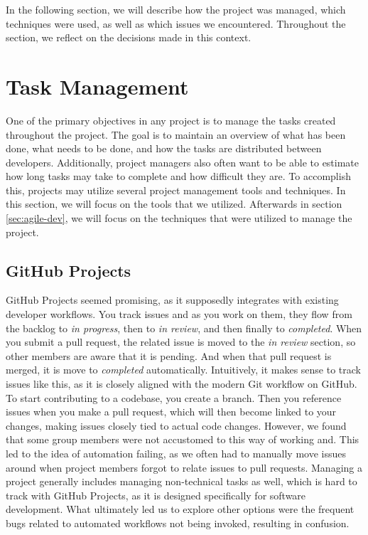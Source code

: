 In the following section, we will describe how the project was managed, which techniques were used, as well as which issues we encountered.
Throughout the section, we reflect on the decisions made in this context.

\section{Task Management}
One of the primary objectives in any project is to manage the tasks created throughout the project. The goal is to maintain an overview of what has been done, what needs to be done, and how the tasks are distributed between developers. Additionally, project managers also often want to be able to estimate how long tasks may take to complete and how difficult they are. To accomplish this, projects may utilize several project management tools and techniques. In this section, we will focus on the tools that we utilized. Afterwards in section \ref{sec:agile-dev}, we will focus on the techniques that were utilized to manage the project.

\subsection{GitHub Projects}
GitHub Projects seemed promising, as it supposedly integrates with existing developer workflows. You track issues and as you work on them, they flow from the backlog to \textit{in progress}, then to \textit{in review}, and then finally to \textit{completed}. When you submit a pull request, the related issue is moved to the \textit{in review} section, so other members are aware that it is pending. And when that pull request is merged, it is move to \textit{completed} automatically.
Intuitively, it makes sense to track issues like this, as it is closely aligned with the modern Git workflow on GitHub. To start contributing to a codebase, you create a branch. Then you reference issues when you make a pull request, which will then become linked to your changes, making issues closely tied to actual code changes.
However, we found that some group members were not accustomed to this way of working and.
This led to the idea of automation failing, as we often had to manually move issues around when project members forgot to relate issues to pull requests.
Managing a project generally includes managing non-technical tasks as well, which is hard to track with GitHub Projects, as it is designed specifically for software development.
What ultimately led us to explore other options were the frequent bugs related to automated workflows not being invoked, resulting in confusion.

